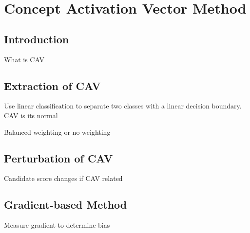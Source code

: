 \chapter{Concept Activation Vector Method} \label{chap:cav}

\section{Introduction}
What is CAV

\section{Extraction of CAV}
Use linear classification to separate two classes with a linear decision boundary. CAV is its normal

Balanced weighting or no weighting

\section{Perturbation of CAV}

Candidate score changes if CAV related

\section{Gradient-based Method}

Measure gradient to determine bias